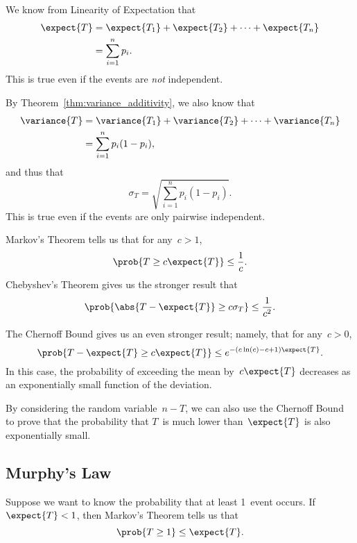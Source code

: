 We know from Linearity of Expectation that
\begin{align*}
\expect{T}
    &= \expect{T_1} + \expect{T_2} + \dots + \expect{T_n} \\
    &= \sum_{i = 1}^n p_i.
\end{align*}
This is true even if the events are \emph{not} independent.

By Theorem~\ref{thm:variance_additivity}, we also know that
\begin{align*}
\variance{T}
     &= \variance{T_1} + \variance{T_2} + \dots + \variance{T_n} \\
     &= \sum_{i = 1}^n p_i (1 - p_i),
\end{align*}
and thus that
\begin{equation*}
    \sigma_T = \sqrt{ \sum_{i = 1}^n p_i (1 - p_i) }.
\end{equation*}
This is true even if the events are only pairwise independent.

Markov's Theorem tells us that for any~$c > 1$,
\begin{equation*}
    \prob{ T \ge c \expect{T} } \le \frac{1}{c}.
\end{equation*}
Chebyshev's Theorem gives us the stronger result that
\begin{equation*}
    \prob{ \abs{T - \expect{T}} \ge c \sigma_T } \le \frac{1}{c^2}.
\end{equation*}

The Chernoff Bound gives us an even stronger result; namely, that for
any~$c > 0$,
\begin{equation*}
\prob{T - \expect{T} \ge c \expect{T}}
    \le e^{-(c \ln(c) - c + 1) \expect{T}}.
\end{equation*}
In this case, the probability of exceeding the mean by~$c \expect{T}$
decreases as an exponentially small function of the deviation.

By considering the random variable~$n - T$, we can also use the
Chernoff Bound to prove that the probability that $T$~is much lower
than~$\expect{T}$ is also exponentially small.  

\subsection{Murphy's Law}

Suppose we want to know the probability that at least 1~event occurs.
If $\expect{T} < 1$, then Markov's Theorem tells us that
\begin{equation*}
    \prob{T \ge 1} \le \expect{T}.
\end{equation*}

